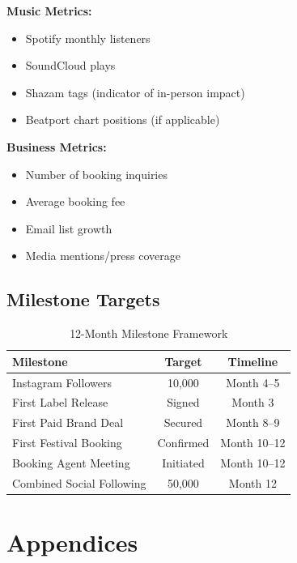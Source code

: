 \documentclass[11pt,a4paper]{article}
\begin{document}
\noindent\textbf{Music Metrics:}
\begin{itemize}[leftmargin=*]
    \item Spotify monthly listeners
    \item SoundCloud plays
    \item Shazam tags (indicator of in-person impact)
    \item Beatport chart positions (if applicable)
\end{itemize}

\noindent\textbf{Business Metrics:}
\begin{itemize}[leftmargin=*]
    \item Number of booking inquiries
    \item Average booking fee
    \item Email list growth
    \item Media mentions/press coverage
\end{itemize}

\subsection{Milestone Targets}

\begin{table}[h!]
\centering
\renewcommand{\arraystretch}{1.3}
\begin{tabularx}{\textwidth}{X c c}
\toprule
\rowcolor{amaraprimary}
\textcolor{amaracream}{\textbf{Milestone}} & \textcolor{amaracream}{\textbf{Target}} & \textcolor{amaracream}{\textbf{Timeline}} \\
\midrule
Instagram Followers & 10,000 & Month 4--5 \\
First Label Release & Signed & Month 3 \\
First Paid Brand Deal & Secured & Month 8--9 \\
First Festival Booking & Confirmed & Month 10--12 \\
Booking Agent Meeting & Initiated & Month 10--12 \\
Combined Social Following & 50,000 & Month 12 \\
\bottomrule
\end{tabularx}
\caption{12-Month Milestone Framework}
\end{table}

\newpage
\section{Appendices}
\end{document}

